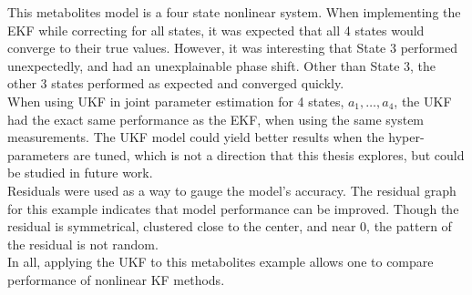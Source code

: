 \noindent This metabolites model is a four state nonlinear system. When implementing the EKF while correcting for all states, it was expected that all 4 states would converge to their true values. However, it was interesting that State 3 performed unexpectedly, and had an unexplainable phase shift. Other than State 3, the other 3 states performed as expected and converged quickly. \\

\noindent When using UKF in joint parameter estimation for 4 states, $a_1, \hdots, a_4$, the UKF had the exact same performance as the EKF, when using the same system measurements. The UKF model could yield better results when the hyper-parameters are tuned, which is not a direction that this thesis explores, but could be studied in future work. \\

\noindent Residuals were used as a way to gauge the model's accuracy. The residual graph for this example indicates that model performance can be improved. Though the residual is symmetrical, clustered close to the center, and near 0, the pattern of the residual is not random. \\

\noindent In all, applying the UKF to this metabolites example allows one to compare performance of nonlinear KF methods. 














